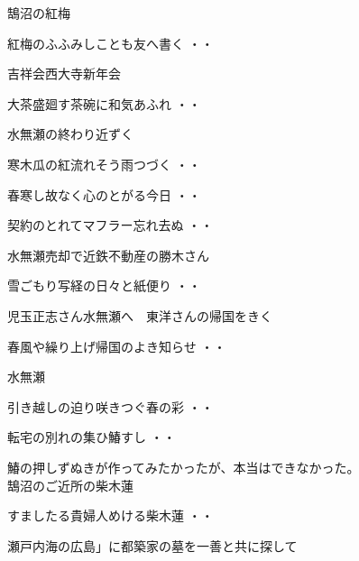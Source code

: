 \vspace{0.4cm}
\noindent 鵠沼の紅梅
\begin{shiika}紅梅のふふみしことも友へ書く
\hfill{・・}\end{shiika}
\vspace{0.4cm}
吉祥会西大寺新年会
\begin{shiika}大茶盛廻す茶碗に和気あふれ
\hfill{・・}\end{shiika}
\vspace{0.4cm}
水無瀬の終わり近ずく
\begin{shiika}寒木瓜の紅流れそう雨つづく
\hfill{・・}\end{shiika}
\begin{shiika}春寒し故なく心のとがる今日
\hfill{・・}\end{shiika}
\begin{shiika}契約のとれてマフラー忘れ去ぬ
\hfill{・・}\end{shiika}
\qquad\qquad\qquad 水無瀬売却で近鉄不動産の勝木さん
\vspace{0.4cm}
\begin{shiika}雪ごもり写経の日々と紙便り
\hfill{・・}\end{shiika}
\vspace{0.4cm}
児玉正志さん水無瀬へ　東洋さんの帰国をきく
\begin{shiika}春風や繰り上げ帰国のよき知らせ
\hfill{・・}\end{shiika}
\vspace{0.4cm}
水無瀬
\begin{shiika}引き越しの迫り咲きつぐ春の彩
\hfill{・・}\end{shiika}
\begin{shiika}転宅の別れの集ひ鰆すし
\hfill{・・}\end{shiika}
\qquad\qquad\qquad 鰆の押しずぬきが作ってみたかったが、本当はできなかった。\\
\vspace{0.4cm}
\noindent
鵠沼のご近所の柴木蓮
\begin{shiika}すましたる貴婦人めける柴木蓮
\hfill{・・}\end{shiika}
\vspace{0.4cm}
瀬戸内海の広島」に都築家の墓を一善と共に探して
